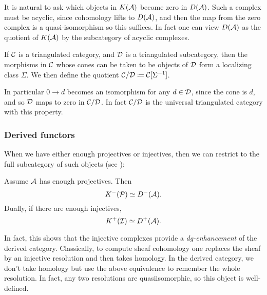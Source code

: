 It is natural to ask which objects in $K(\mathcal{A})$ become zero in $D(\mathcal{A})$. Such
a complex must be acyclic, since cohomology lifts to $D(\mathcal{A})$, and then the
map from the zero complex is a quasi-isomorphism so this suffices. In fact one
can view $D(\mathcal{A})$ as the quotient of $K(\mathcal{A})$ by the subcategory of acyclic
complexes.

\begin{definition}[label=defn:verdierquotient]{}{}
    If $\mathcal{C}$ is a triangulated category, and $\mathcal{D}$ is a triangulated
    subcategory, then the morphisms in $\mathcal{C}$ whose cones can be taken to be
    objects of $\mathcal{D}$ form a localizing class $\Sigma$. We then define the
    quotient $\mathcal{C}/\mathcal{D}\coloneqq\mathcal{C}[\Sigma^{-1}]$.
\end{definition}

\begin{remark}{}{}
    In particular $0\to d$ becomes an isomorphism for any $d\in\mathcal{D}$, since the
    cone is $d$, and so $\mathcal{D}$ maps to zero in $\mathcal{C}/\mathcal{D}$. In fact
    $\mathcal{C}/\mathcal{D}$ is the universal triangulated category with this property.
\end{remark}

\subsubsection{Derived functors}

When we have either enough projectives or injectives, then we can restrict to the full subcategory of such objects (see \cite[Proposition~2.40]{Huybrechts}):

\begin{theorem}[label=thm:DfromK]{}{}
    Assume $\mathcal{A}$ has enough projectives. Then
    \begin{equation*}
        K^-(\mathcal{P}) \simeq D^-(\mathcal{A}).
    \end{equation*}
    Dually, if there are enough injectives,
    \begin{equation*}
        K^+(\mathcal{I}) \simeq D^+(\mathcal{A}).
    \end{equation*}
\end{theorem}

In fact, this shows that the injective complexes provide a \emph{dg-enhancement} of the derived category. Classically, to compute sheaf cohomology one replaces the sheaf by an injective resolution and then takes homology. In the derived category, we don't take homology but use the above equivalence to remember the whole resolution. In fact, any two resolutions are quasiisomorphic, so this object is well-defined.

